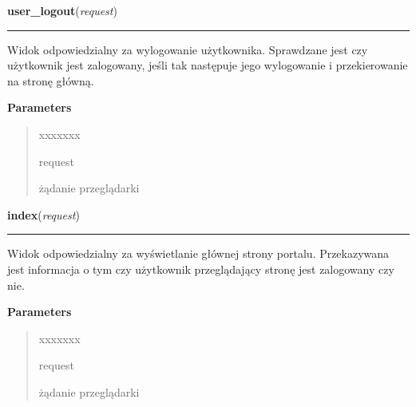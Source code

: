 \hspace{.8\funcindent}\begin{boxedminipage}{\funcwidth}

    \raggedright \textbf{user\_logout}(\textit{request})

    \vspace{-1.5ex}

    \rule{\textwidth}{0.5\fboxrule}
\setlength{\parskip}{2ex}
    Widok odpowiedzialny za wylogowanie użytkownika. Sprawdzane jest czy 
    użytkownik jest zalogowany, jeśli tak następuje jego wylogowanie i 
    przekierowanie na stronę główną.

\setlength{\parskip}{1ex}
      \textbf{Parameters}
      \vspace{-1ex}

      \begin{quote}
        \begin{Ventry}{xxxxxxx}

          \item[request]

          żądanie przeglądarki

        \end{Ventry}

      \end{quote}

    \end{boxedminipage}

    \label{ass8_portal:accounts:views:index}

    \vspace{0.5ex}

\hspace{.8\funcindent}\begin{boxedminipage}{\funcwidth}

    \raggedright \textbf{index}(\textit{request})

    \vspace{-1.5ex}

    \rule{\textwidth}{0.5\fboxrule}
\setlength{\parskip}{2ex}
    Widok odpowiedzialny za wyświetlanie głównej strony portalu. 
    Przekazywana jest informacja o tym czy użytkownik przeglądający stronę 
    jest zalogowany czy nie.

\setlength{\parskip}{1ex}
      \textbf{Parameters}
      \vspace{-1ex}

      \begin{quote}
        \begin{Ventry}{xxxxxxx}

          \item[request]

          żądanie przeglądarki

        \end{Ventry}

      \end{quote}

    \end{boxedminipage}

